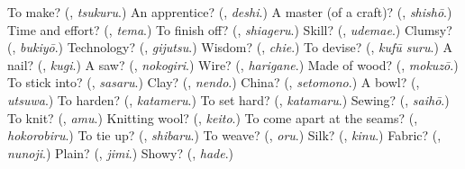 \begin{tcolorbox}[breakable,colback=teal!4,colframe=teal!35!black,title={Before you move on}]
To make? (\textbf{}, \emph{tsukuru}.) An apprentice? (\textbf{}, \emph{deshi}.) A master (of a craft)? (\textbf{}, \emph{shishō}.) Time and effort? (\textbf{}, \emph{tema}.) To finish off? (\textbf{}, \emph{shiageru}.) Skill? (\textbf{}, \emph{udemae}.) Clumsy? (\textbf{}, \emph{bukiyō}.) Technology? (\textbf{}, \emph{gijutsu}.) Wisdom? (\textbf{}, \emph{chie}.) To devise? (\textbf{}, \emph{kufū suru}.) A nail? (\textbf{}, \emph{kugi}.) A saw? (\textbf{}, \emph{nokogiri}.) Wire? (\textbf{}, \emph{harigane}.) Made of wood? (\textbf{}, \emph{mokuzō}.) To stick into? (\textbf{}, \emph{sasaru}.) Clay? (\textbf{}, \emph{nendo}.) China? (\textbf{}, \emph{setomono}.) A bowl? (\textbf{}, \emph{utsuwa}.) To harden? (\textbf{}, \emph{katameru}.) To set hard? (\textbf{}, \emph{katamaru}.) Sewing? (\textbf{}, \emph{saihō}.) To knit? (\textbf{}, \emph{amu}.) Knitting wool? (\textbf{}, \emph{keito}.) To come apart at the seams? (\textbf{}, \emph{hokorobiru}.) To tie up? (\textbf{}, \emph{shibaru}.) To weave? (\textbf{}, \emph{oru}.) Silk? (\textbf{}, \emph{kinu}.) Fabric? (\textbf{}, \emph{nunoji}.) Plain? (\textbf{}, \emph{jimi}.) Showy? (\textbf{}, \emph{hade}.)
\end{tcolorbox}
